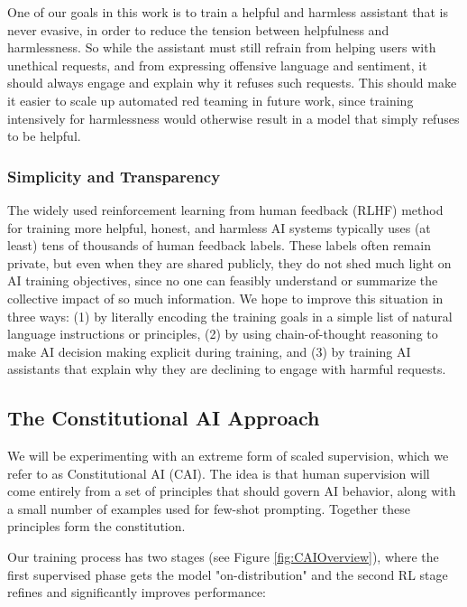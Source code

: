 One of our goals in this work is to train a helpful and harmless assistant that is never evasive, in order to reduce the tension between helpfulness and harmlessness.  So while the assistant must still refrain from helping users with unethical requests, and from expressing offensive language and sentiment, it should always engage and explain why it refuses such requests.  This should make it easier to scale up automated red teaming \cite{PerezRedTeamingLMswithLMs} in future work, since training intensively for harmlessness would otherwise result in a model that simply refuses to be helpful.

\subsubsection*{Simplicity and Transparency}

The  widely used reinforcement learning from human feedback (RLHF) method \cite{christiano2017deep, stiennon2020learning} for training more helpful, honest, and harmless AI systems \cite{bai2022training, LaMDA, InstructGPT, SparrowDM} typically uses (at least) tens of thousands of human feedback labels.  These labels often remain  private, but even when they are shared publicly, they do not shed much light on AI training objectives, since no one can feasibly understand or summarize the collective impact of so much information. We hope to improve this situation in three ways: (1) by literally encoding the training goals in a simple list of natural language instructions or principles, (2) by using chain-of-thought reasoning \cite{ScratchPad, ChainOfThought} to make AI decision making explicit during training, and (3) by training AI assistants that explain why they are declining to engage with harmful requests.

\subsection{The Constitutional AI Approach}

We will be experimenting with an extreme form of scaled supervision, which we refer to as Constitutional AI (CAI).  The idea is that human supervision will come entirely from a set of principles that should govern AI behavior, along with a small number of examples used for few-shot prompting.  Together these principles form the constitution.

Our training process has two stages (see Figure \ref{fig:CAIOverview}), where the first supervised phase gets the model "on-distribution" and the second RL stage refines and significantly improves performance:

